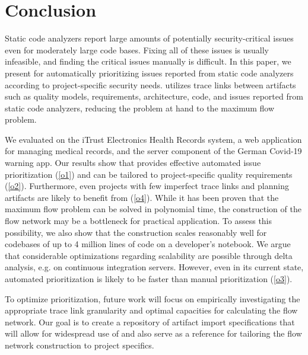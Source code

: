 \section{Conclusion}
\label{sec:conslusion}
Static code analyzers report large amounts of potentially security-critical issues even for moderately large code bases.
Fixing all of these issues is usually infeasible, and finding the critical issues manually is difficult.
In this paper, we present \appr{} for automatically prioritizing issues reported from static code analyzers according to project-specific security needs.
\appr{} utilizes trace links between artifacts such as quality models, requirements, architecture, code, and issues reported from static code analyzers, reducing the problem at hand to the maximum flow problem.

We evaluated \appr{} on the iTrust Electronics Health Records system, a web application for managing medical records, and the server component of the German Covid-19 warning app.
Our results show that \appr{} provides effective automated issue prioritization (\ref{o1}) and can be tailored to project-specific quality requirements (\ref{o2}).
Furthermore, even projects with few imperfect trace links and planning artifacts are likely to benefit from \appr{} (\ref{o4}).
While it has been proven that the maximum flow problem can be solved in polynomial time, the construction of the flow network may be a bottleneck for practical application.
To assess this possibility, we also show that the construction scales reasonably well for codebases of up to 4 million lines of code on a developer's notebook.
We argue that considerable optimizations regarding scalability are possible through delta analysis, e.g. on continuous integration servers.
However, even in its current state,  automated prioritization is likely to be faster than manual prioritization (\ref{o3}).

To optimize prioritization, future work will focus on empirically investigating the appropriate trace link granularity and optimal capacities for calculating the flow network.
Our goal is to create a repository of artifact import specifications that will allow for widespread use of \appr{} and also serve as a reference for tailoring the flow network construction to project specifics.%

